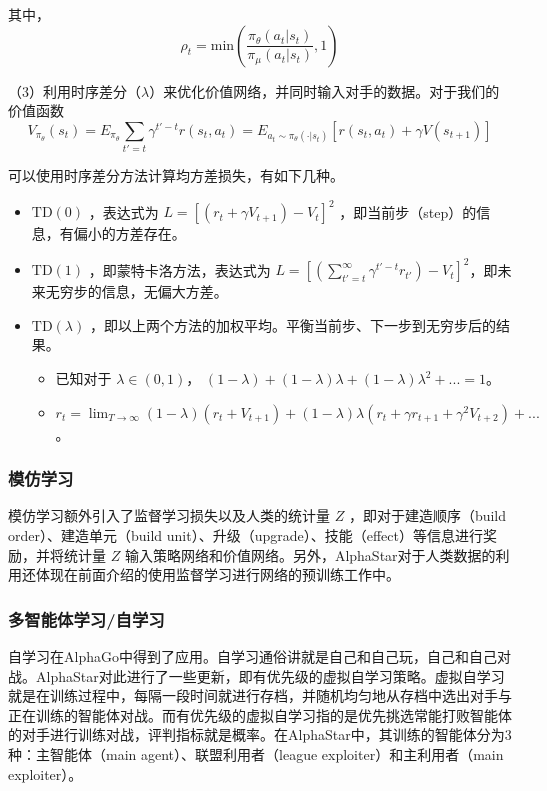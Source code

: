 其中，
\begin{equation}\nonumber
    \label{eq:}
    \rho_t = \mathrm{min}(\frac{\pi_{\theta} (a_t|s_t)}{\pi_{\mu} (a_t|s_t)},1)
\end{equation}

（3）利用时序差分（$\lambda$）来优化价值网络，并同时输入对手的数据。对于我们的价值函数
\begin{equation}\nonumber
    \label{eq:}
    V_{\pi_{\theta}}(s_t)=E_{\pi_{\theta}}\sum_{t'=t}\gamma^{t'-t}r(s_t,a_t)=E_{a_t\sim\pi_{\theta}(\cdot|s_t)}[r(s_t,a_t)+\gamma V(s_{t+1})]
\end{equation}

可以使用时序差分方法计算均方差损失，有如下几种。
\begin{itemize}
    \item $\mathrm{TD}(0)$ ，表达式为 $L = [(r_t+\gamma V_{t+1})-V_t]^2$ ，即当前步（step）的信息，有偏小的方差存在。
    \item $\mathrm{TD}(1)$ ，即蒙特卡洛方法，表达式为 $L = [(\sum_{t'=t}^\infty\gamma^{t'-t}r_{t'})-V_t]^2$，即未来无穷步的信息，无偏大方差。
    \item $\mathrm{TD}(\lambda)$ ，即以上两个方法的加权平均。平衡当前步、下一步到无穷步后的结果。
    \begin{itemize}
        \item 已知对于 $\lambda \in (0,1)$， $(1-\lambda)+(1-\lambda)\lambda+(1-\lambda)\lambda ^2+...=1$。
        \item $r_t = \lim_{T\rightarrow\infty} (1-\lambda)(r_t+V_{t+1})+(1-\lambda)\lambda(r_t+\gamma r_{t+1}+\gamma^2 V_{t+2})+...$。
    \end{itemize}
\end{itemize}

\subsubsection{模仿学习} 
模仿学习额外引入了监督学习损失以及人类的统计量 $Z$ ，即对于建造顺序（build order）、建造单元（build unit）、升级（upgrade）、技能（effect）等信息进行奖励，并将统计量 $Z$ 输入策略网络和价值网络。另外，AlphaStar对于人类数据的利用还体现在前面介绍的使用监督学习进行网络的预训练工作中。

\subsubsection{多智能体学习/自学习} 

自学习在AlphaGo中得到了应用。自学习通俗讲就是自己和自己玩，自己和自己对战。AlphaStar对此进行了一些更新，即有优先级的虚拟自学习策略。虚拟自学习就是在训练过程中，每隔一段时间就进行存档，并随机均匀地从存档中选出对手与正在训练的智能体对战。而有优先级的虚拟自学习指的是优先挑选常能打败智能体的对手进行训练对战，评判指标就是概率。在AlphaStar中，其训练的智能体分为3种：主智能体（main agent）、联盟利用者（league exploiter）和主利用者（main exploiter）。

